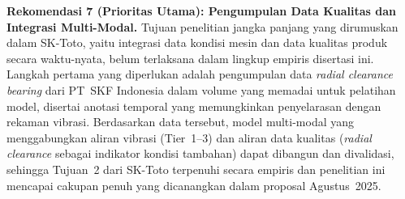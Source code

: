 \textbf{Rekomendasi 7 (Prioritas Utama): Pengumpulan Data Kualitas dan Integrasi
Multi-Modal.} Tujuan penelitian jangka panjang yang dirumuskan dalam SK-Toto,
yaitu integrasi data kondisi mesin dan data kualitas produk secara waktu-nyata,
belum terlaksana dalam lingkup empiris disertasi ini. Langkah pertama yang
diperlukan adalah pengumpulan data \emph{radial clearance} \emph{bearing} dari
PT~SKF Indonesia dalam volume yang memadai untuk pelatihan model, disertai
anotasi temporal yang memungkinkan penyelarasan dengan rekaman vibrasi.
Berdasarkan data tersebut, model multi-modal yang menggabungkan aliran vibrasi
(Tier~1--3) dan aliran data kualitas (\emph{radial clearance} sebagai indikator
kondisi tambahan) dapat dibangun dan divalidasi, sehingga Tujuan~2 dari SK-Toto
terpenuhi secara empiris dan penelitian ini mencapai cakupan penuh yang
dicanangkan dalam proposal Agustus~2025.
